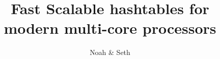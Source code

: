 \documentclass[12pt,twocolumn,letterpaper]{article}
\begin{document}
\title{Fast Scalable hashtables for modern multi-core processors}

\author{Noah \& Seth}












\end{document}
